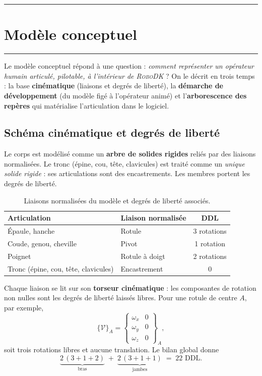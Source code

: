 \documentclass[12pt]{article}
\newcommand{\barre}{\noindent\textcolor{supmerange}{\rule{\textwidth}{3pt}}}
\newcommand{\rsection}[1]{%
  \barre\par\vspace{2pt}%
  \section{#1}%
  \vspace{-6pt}\barre\par\vspace{0.7em}}
\begin{document}


\rsection{Modèle conceptuel}
\label{sec:modele}

Le modèle conceptuel répond à une question : \emph{comment représenter un
opérateur humain articulé, pilotable, à l'intérieur de \textsc{RoboDK}} ? On le
décrit en trois temps : la base \textbf{cinématique} (liaisons et degrés de
liberté), la \textbf{démarche de développement} (du modèle figé à l'opérateur
animé) et l'\textbf{arborescence des repères} qui matérialise l'articulation
dans le logiciel.

\subsection{Schéma cinématique et degrés de liberté}
\label{ssec:cinematique}

Le corps est modélisé comme un \textbf{arbre de solides rigides} reliés par des
liaisons normalisées. Le tronc (épine, cou, tête, clavicules)
est traité comme un \emph{unique solide rigide} : ses articulations sont des
encastrements. Les membres portent les degrés de liberté.

\begin{table}[H]
\centering
\caption{Liaisons normalisées du modèle et degrés de liberté associés.}
\label{tab:liaisons}
\begin{tabular}{@{}llc@{}}
\toprule
\textbf{Articulation} & \textbf{Liaison normalisée} & \textbf{DDL} \\
\midrule
Épaule, hanche & Rotule & 3 rotations \\
Coude, genou, cheville & Pivot & 1 rotation \\
Poignet & Rotule à doigt & 2 rotations \\
Tronc (épine, cou, tête, clavicules) & Encastrement & 0 \\
\bottomrule
\end{tabular}
\end{table}

Chaque liaison se lit sur son \textbf{torseur cinématique} : les composantes de
rotation non nulles sont les degrés de liberté laissés libres. Pour une rotule de
centre $A$, par exemple,
\[
\{\mathcal{V}\}_A=\begin{Bmatrix}\omega_x & 0\\ \omega_y & 0\\ \omega_z & 0\end{Bmatrix}_A ,
\]
soit trois rotations libres et aucune translation. Le bilan global donne
\[
\underbrace{2\,(3+1+2)}_{\text{bras}} \;+\; \underbrace{2\,(3+1+1)}_{\text{jambes}} \;=\; \boxed{22 \text{ DDL}} .
\]
\end{document}

